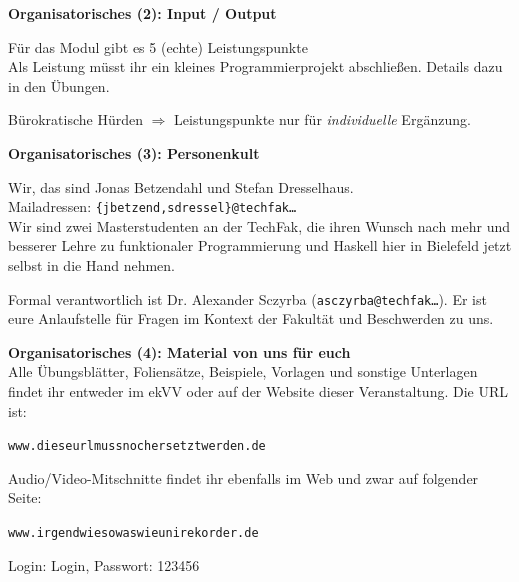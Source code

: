 \documentclass[unknownkeysallowed]{beamer}
\begin{document}
  
  \begin{frame}
    \begin{center}
    \Large\textbf{Organisatorisches (2): Input / Output}\\ \bigskip \normalsize
    
    Für das Modul gibt es 5 (echte) Leistungspunkte\\
    Als Leistung müsst ihr ein kleines Programmierprojekt abschließen.
    Details dazu in den Übungen.\bigskip
    
    Bürokratische Hürden $\Rightarrow$ Leistungspunkte nur für \emph{individuelle} Ergänzung.
    \end{center}
  \end{frame}
  
  
  \begin{frame}
    \begin{center}
    \Large\textbf{Organisatorisches (3): Personenkult}\\ \bigskip \normalsize

	Wir, das sind Jonas Betzendahl und Stefan Dresselhaus.\\
	Mailadressen: \texttt{\{jbetzend,sdressel\}@techfak\dots}\\ \bigskip
	Wir sind zwei Masterstudenten an der TechFak, die ihren Wunsch nach mehr und besserer Lehre zu funktionaler Programmierung und Haskell hier in Bielefeld jetzt selbst in die Hand nehmen. \bigskip    
    
    Formal verantwortlich ist Dr. Alexander Sczyrba (\texttt{asczyrba@techfak\dots}). Er ist eure Anlaufstelle für Fragen im Kontext der Fakultät und Beschwerden zu uns.
    \end{center}
  \end{frame}
  
  
  \begin{frame}
    \begin{center}
	\Large\textbf{Organisatorisches (4): Material von uns für euch}\\ \bigskip \normalsize
	Alle Übungsblätter, Foliensätze, Beispiele, Vorlagen und sonstige Unterlagen findet ihr entweder im ekVV oder auf der Website dieser Veranstaltung. Die URL ist:
	
	\bigskip\texttt{www.dieseurlmussnochersetztwerden.de}\bigskip
	
	Audio/Video-Mitschnitte findet ihr ebenfalls im Web und zwar auf folgender Seite:
	
	\bigskip\texttt{www.irgendwiesowaswieunirekorder.de}\bigskip
	
	Login: Login, Passwort: 123456
    \end{center}
  \end{frame}
  
\end{document}
